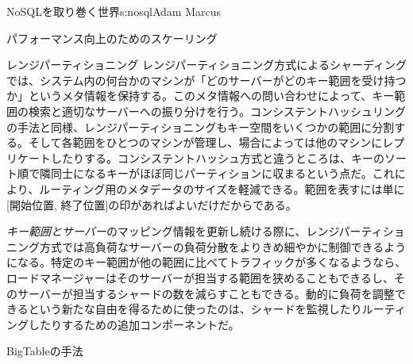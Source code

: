 \begin{aosachapter}{NoSQLを取り巻く世界}{s:nosql}{Adam Marcus}
\begin{aosasect1}{パフォーマンス向上のためのスケーリング}
\begin{aosasect2}{レンジパーティショニング}
レンジパーティショニング方式によるシャーディングでは、システム内の何台かのマシンが「どのサーバーがどのキー範囲を受け持つか」というメタ情報を保持する。このメタ情報への問い合わせによって、キー範囲の検索と適切なサーバーへの振り分けを行う。コンシステントハッシュリングの手法と同様、レンジパーティショニングもキー空間をいくつかの範囲に分割する。そして各範囲をひとつのマシンが管理し、場合によっては他のマシンにレプリケートしたりする。コンシステントハッシュ方式と違うところは、キーのソート順で隣同士になるキーがほぼ同じパーティションに収まるという点だ。これにより、ルーティング用のメタデータのサイズを軽減できる。範囲を表すには単に[開始位置, 終了位置]の印があればよいだけだからである。

\emph{キー範囲とサーバー}のマッピング情報を更新し続ける際に、レンジパーティショニング方式では高負荷なサーバーの負荷分散をよりきめ細やかに制御できるようになる。特定のキー範囲が他の範囲に比べてトラフィックが多くなるようなら、ロードマネージャーはそのサーバーが担当する範囲を狭めることもできるし、そのサーバーが担当するシャードの数を減らすこともできる。動的に負荷を調整できるという新たな自由を得るために使ったのは、シャードを監視したりルーティングしたりするための追加コンポーネントだ。

\vspace{-0.1cm} %
\begin{aosasect3}{BigTableの手法}


\end{aosasect3}
\end{aosasect2}
\end{aosasect1}
\end{aosachapter}
